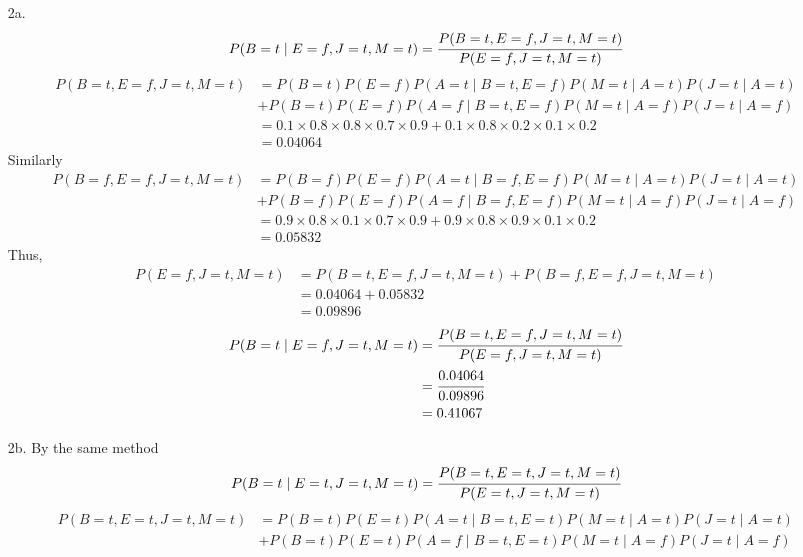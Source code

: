\documentclass[a4paper]{article}
\theoremstyle{definition}
\newenvironment{soln}{
	\leavevmode\color{blue}\ignorespaces
}{}
\begin{document}
\begin{soln}

\begin{itemize}
	\item[2a.]
		\begin{align*}
			P(B=t \mid E=f,J=t,M=t) &= \cfrac{P(B=t,E=f,J=t,M=t)}{P(E=f,J=t,M=t)} \\
		\end{align*}
		\begin{align*}
			P(B=t,E=f,J=t,M=t) &= P(B=t)P(E=f)P(A=t \mid B=t,E=f)P(M=t \mid A=t)P(J=t \mid A=t) \\ &+  P(B=t)P(E=f)P(A=f \mid B=t,E=f)P(M=t \mid A=f)P(J=t \mid A=f)\\
			&= 0.1 \times 0.8 \times 0.8 \times 0.7 \times 0.9 + 0.1 \times 0.8 \times 0.2 \times 0.1 \times 0.2 \\
			&= 0.04064
		\end{align*}
		Similarly 
		\begin{align*}
			P(B=f,E=f,J=t,M=t) &= P(B=f)P(E=f)P(A=t \mid B=f,E=f)P(M=t \mid A=t)P(J=t \mid A=t) \\ &+  P(B=f)P(E=f)P(A=f \mid B=f,E=f)P(M=t \mid A=f)P(J=t \mid A=f)\\
			&= 0.9 \times 0.8 \times 0.1 \times 0.7 \times 0.9 + 0.9 \times 0.8 \times 0.9 \times 0.1 \times 0.2 \\
			&= 0.05832
		\end{align*}
		Thus,
		\begin{align*}
			P(E=f,J=t,M=t) &= P(B=t,E=f,J=t,M=t) + P(B=f,E=f,J=t,M=t) \\
			&= 0.04064 + 0.05832 \\
			&= 0.09896
		\end{align*}
		\begin{align*}
			P(B=t \mid E=f,J=t,M=t) &= \cfrac{P(B=t,E=f,J=t,M=t)}{P(E=f,J=t,M=t)} \\
			&= \cfrac{0.04064}{0.09896} \\
			&= 0.41067
	\end{align*}
	\item[2b.]
	By the same method
	\begin{align*}
		P(B=t \mid E=t,J=t,M=t) &= \cfrac{P(B=t,E=t,J=t,M=t)}{P(E=t,J=t,M=t)} \\
	\end{align*}
	\begin{align*}
		P(B=t,E=t,J=t,M=t) &= P(B=t)P(E=t)P(A=t \mid B=t,E=t)P(M=t \mid A=t)P(J=t \mid A=t) \\ &+  P(B=t)P(E=t)P(A=f \mid B=t,E=t)P(M=t \mid A=f)P(J=t \mid A=f)\\

\end{align*}
\end{itemize}
\end{soln}
\end{document}
